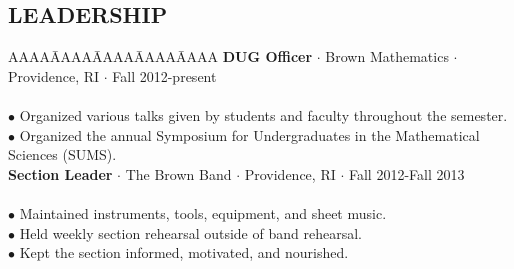 \documentclass{res}
\begin{document}
\begin{resume}
\section{LEADERSHIP}
\myvspace
\begin{tabbing}
   AAAA\=AAAA\=AAAA\=AAAA\=AAAA\kill
{\bf DUG Officer} $\cdot$ Brown Mathematics $\cdot$ Providence, RI $\cdot$ Fall 2012-present\\
	\\
	\>$\bullet$ Organized various talks given by students and faculty throughout the semester. \\
	\>$\bullet$ Organized the annual Symposium for Undergraduates in the Mathematical Sciences (SUMS).\\
\sbreak
{\bf Section Leader} $\cdot$ The Brown Band $\cdot$ Providence, RI $\cdot$ Fall 2012-Fall 2013\\
	\\
	\>$\bullet$ Maintained instruments, tools, equipment, and sheet music.\\ 
	\>$\bullet$ Held weekly section rehearsal outside of band rehearsal.\\
	\>$\bullet$ Kept the section informed, motivated, and nourished.\\

\end{tabbing}
\end{resume}
\end{document}
